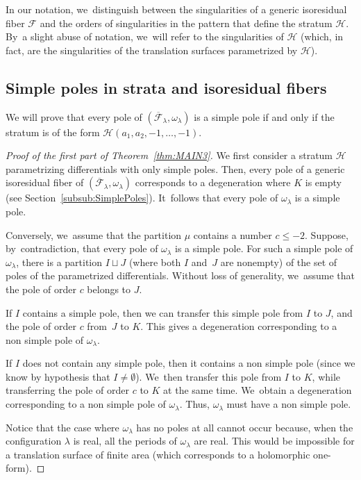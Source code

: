\documentclass[11pt]{article}
\newcommand{\Subsection}{\subsection}
\theoremstyle{definition}
\begin{document}
In our notation, we~distinguish between the singularities of a generic isoresidual fiber $\mathcal{F}$ and the orders of singularities in the pattern that define the stratum $\mathcal{H}$. By~a slight abuse of notation, we~will refer to the singularities of $\mathcal{H}$ (which, in fact, are the singularities of the translation surfaces parametrized by $\mathcal{H}$).

\Subsection{Simple poles in strata and isoresidual fibers}\label{sub:7Simple}

We will prove that every pole of $(\overline{\mathcal{F}}_{\lambda},\omega_{\lambda})$ is a simple pole if and only if the stratum is of the form $\mathcal{H}(a_{1},a_{2},-1,\dots,-1)$.

\begin{proof}[Proof of the first part of Theorem~\ref{thm:MAIN3}]
We first consider a stratum $\mathcal{H}$ parametrizing differentials with only simple poles. Then, every pole of a generic isoresidual fiber of $(\overline{\mathcal{F}}_{\lambda},\omega_{\lambda})$ corresponds to a degeneration where $K$ is empty (see Section~\ref{subsub:SimplePoles}). It~follows that every pole of $\omega_{\lambda}$ is a simple pole.

Conversely, we~assume that the partition $\mu$ contains a number $c \leq -2$. Suppose, by~contradiction, that every pole of $\omega_{\lambda}$ is a simple pole. For such a simple pole of $\omega_{\lambda}$, there is a partition $I \sqcup J$ (where both $I$ and~$J$ are nonempty) of the set of poles of the parametrized differentials. Without loss of generality, we~assume that the pole of order $c$ belongs to $J$.

If $I$ contains a simple pole, then we can transfer this simple pole from $I$ to $J$, and the pole of order $c$ from~$J$ to $K$. This gives a degeneration corresponding to a non simple pole of $\omega_{\lambda}$.

If $I$ does not contain any simple pole, then it contains a non simple pole (since we know by hypothesis that $I \neq \emptyset$). We~then transfer this pole from $I$ to $K$, while transferring the pole of order $c$ to $K$ at the same time. We~obtain a degeneration corresponding to a non simple pole of $\omega_{\lambda}$. Thus, $\omega_{\lambda}$ must have a non simple pole.

Notice that the case where $\omega_{\lambda}$ has no poles at all cannot occur because, when the configuration $\lambda$ is real, all the periods of $\omega_{\lambda}$ are real. This would be impossible for a translation surface of finite area (which corresponds to a holomorphic one-form).
\end{proof}
\end{document}
